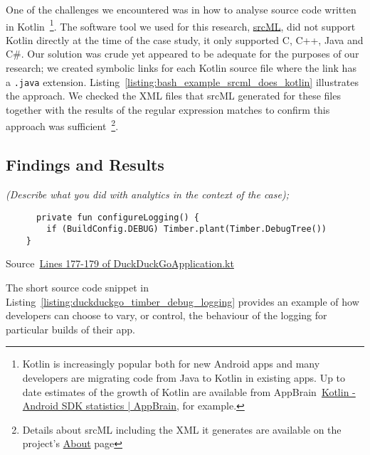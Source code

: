 One of the challenges we encountered was in how to analyse source code written in Kotlin~\footnote{Kotlin is increasingly popular both for new Android apps and many developers are migrating code from Java to Kotlin in existing apps. Up to date estimates of the growth of Kotlin are available from AppBrain~\href{https://www.appbrain.com/stats/libraries/details/kotlin/kotlin}{Kotlin - Android SDK statistics | AppBrain}, for example.}. 
The software tool we used for this research, \href{https://www.srcml.org/}{srcML}, did not support Kotlin directly at the time of the case study, it only supported C, C++, Java and C\#. Our solution was crude yet appeared to be adequate for the purposes of our research; we created symbolic links for each Kotlin source file where the link has a \texttt{.java} extension. Listing~\ref{listing:bash_example_srcml_does_kotlin} illustrates the approach. We checked the XML files that srcML generated for these files together with the results of the regular expression matches to confirm this approach was sufficient~\footnote{Details about srcML including the XML it generates are available on the project's \href{https://www.srcml.org/about.html}{About} page}. 

\subsection{Findings and Results}
\textit{(Describe what you did with analytics in the context of the case);} 




\begin{listing}
\begin{verbatim}
      private fun configureLogging() {
        if (BuildConfig.DEBUG) Timber.plant(Timber.DebugTree())
    }
\end{verbatim}
\caption{Source~\href{https://github.com/duckduckgo/Android/blob/2f3d42be6a972551c2330daccba6ff4039e1c1a8/app/src/main/java/com/duckduckgo/app/global/DuckDuckGoApplication.kt\#L177-L179}{Lines 177-179 of DuckDuckGoApplication.kt}}
\label{listing:duckduckgo_timber_debug_logging}
\end{listing}

The short source code snippet in Listing~\ref{listing:duckduckgo_timber_debug_logging} provides an example of how developers can choose to vary, or control, the behaviour of the logging for particular builds of their app.



